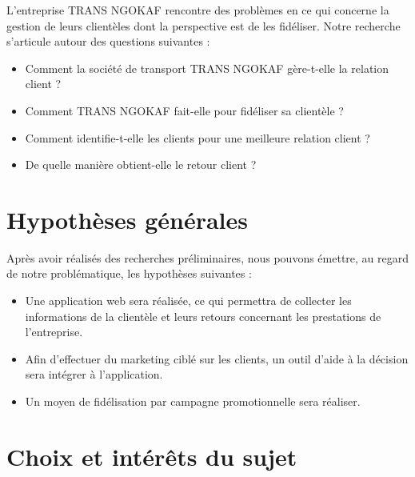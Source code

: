     L’entreprise TRANS NGOKAF rencontre des problèmes en ce qui concerne
    la gestion de leurs clientèles dont la perspective est de les
    fidéliser.
    Notre recherche s’articule autour des questions suivantes :
    \newline 
        \begin{itemize}
            \item [\ding{226}] Comment la société de transport TRANS NGOKAF gère-t-elle
            la relation client ?
            \newline
            \item [\ding{226}] Comment TRANS NGOKAF fait-elle pour fidéliser sa clientèle ?
            \newline
            \item [\ding{226}] Comment identifie-t-elle les clients pour une
            meilleure relation client ?
            \newline
            \item [\ding{226}] De quelle manière obtient-elle le retour client ?
        \end{itemize}
    \section[Hypothèses générales]{Hypothèses générales}
    Après avoir réalisés des recherches préliminaires, nous pouvons émettre, au regard
    de notre problématique, les hypothèses suivantes : 
    \newline
    \begin{itemize}
        \item [\ding{226}] Une application web sera réalisée, ce qui permettra de collecter
        les informations de la clientèle et leurs retours concernant les prestations de l’entreprise.
        \newline
        \item [\ding{226}] Afin d’effectuer du marketing ciblé sur les clients, un outil d’aide à
        la décision sera intégrer à l’application.
        \newline
        \item [\ding{226}] Un moyen de fidélisation par campagne promotionnelle sera réaliser.
        
    \end{itemize}
    \section[Choix et interet du sujet]{Choix et intérêts du sujet}
